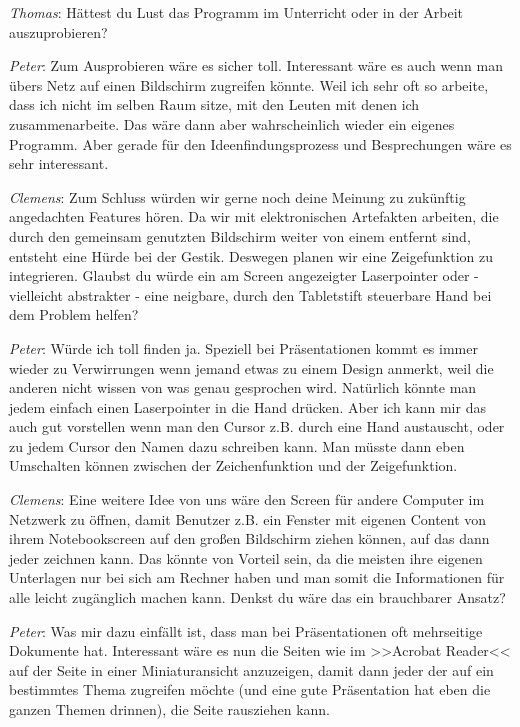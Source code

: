 \medskip \emph{Thomas}: Hättest du Lust das Programm im Unterricht oder in der Arbeit auszuprobieren?

\medskip \emph{Peter}: Zum Ausprobieren wäre es sicher toll. Interessant wäre es auch wenn man übers Netz auf einen Bildschirm zugreifen könnte. Weil ich sehr oft so arbeite, dass ich nicht im selben Raum sitze, mit den Leuten mit denen ich zusammenarbeite. Das wäre dann aber wahrscheinlich wieder ein eigenes Programm. Aber gerade für den Ideenfindungsprozess und Besprechungen wäre es sehr interessant.

\medskip \emph{Clemens}: Zum Schluss würden wir gerne noch deine Meinung zu zukünftig angedachten Features hören. 
Da wir mit elektronischen Artefakten arbeiten, die durch den gemeinsam genutzten Bildschirm weiter von einem entfernt sind, entsteht eine Hürde bei der Gestik. Deswegen planen wir eine Zeigefunktion zu integrieren. Glaubst du würde ein am Screen angezeigter Laserpointer oder - vielleicht abstrakter - eine neigbare, durch den Tabletstift steuerbare Hand bei dem Problem helfen?

\medskip \emph{Peter}: Würde ich toll finden ja. Speziell bei Präsentationen kommt es immer wieder zu Verwirrungen wenn jemand etwas zu einem Design anmerkt, weil die anderen nicht wissen von was genau gesprochen wird. Natürlich könnte man jedem einfach einen Laserpointer in die Hand drücken. Aber ich kann mir das auch gut vorstellen wenn man den Cursor z.B. durch eine Hand austauscht, oder zu jedem Cursor den Namen dazu schreiben kann. Man müsste dann eben Umschalten können zwischen der Zeichenfunktion und der Zeigefunktion.

\medskip \emph{Clemens}: Eine weitere Idee von uns wäre den Screen für andere Computer im Netzwerk zu öffnen, damit Benutzer z.B. ein Fenster mit eigenen Content von ihrem Notebookscreen auf den großen Bildschirm ziehen können, auf das dann jeder zeichnen kann. Das könnte von Vorteil sein, da die meisten ihre eigenen Unterlagen nur bei sich am Rechner haben und man somit die Informationen für alle leicht zugänglich machen kann. Denkst du wäre das ein brauchbarer Ansatz?

\medskip \emph{Peter}: Was mir dazu einfällt ist, dass man bei Präsentationen oft mehrseitige Dokumente hat. Interessant wäre es nun die Seiten wie im >>Acrobat Reader<< auf der Seite in einer Miniaturansicht anzuzeigen, damit dann jeder der auf ein bestimmtes Thema zugreifen möchte (und eine gute Präsentation hat eben die ganzen Themen drinnen), die Seite rausziehen kann.

